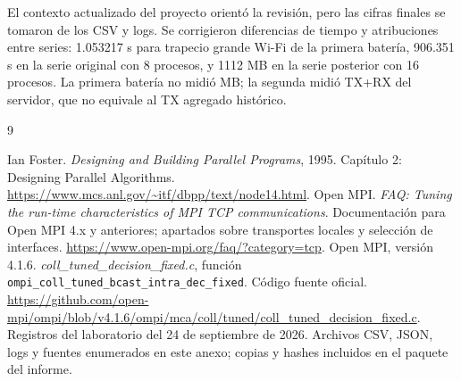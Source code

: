 El contexto actualizado del proyecto orientó la revisión, pero las cifras finales se tomaron de los CSV y logs. Se corrigieron diferencias de tiempo y atribuciones entre series: 1.053217 s para trapecio grande Wi-Fi de la primera batería, 906.351 s en la serie original con 8 procesos, y 1112 MB en la serie posterior con 16 procesos. La primera batería no midió MB; la segunda midió TX+RX del servidor, que no equivale al TX agregado histórico.

\begin{thebibliography}{9}
\raggedright
{} Ian Foster. \emph{Designing and Building Parallel Programs}, 1995. Capítulo 2: Designing Parallel Algorithms. \url{https://www.mcs.anl.gov/~itf/dbpp/text/node14.html}.
 Open MPI. \emph{FAQ: Tuning the run-time characteristics of MPI TCP communications}. Documentación para Open MPI 4.x y anteriores; apartados sobre transportes locales y selección de interfaces. \url{https://www.open-mpi.org/faq/?category=tcp}.
 Open MPI, versión 4.1.6. \emph{coll\_tuned\_decision\_fixed.c}, función \texttt{ompi\_coll\_tuned\_bcast\_intra\_dec\_fixed}. Código fuente oficial. \url{https://github.com/open-mpi/ompi/blob/v4.1.6/ompi/mca/coll/tuned/coll_tuned_decision_fixed.c}.
 Registros del laboratorio del 24 de septiembre de 2026. Archivos CSV, JSON, logs y fuentes enumerados en este anexo; copias y hashes incluidos en el paquete del informe.
\end{thebibliography}
